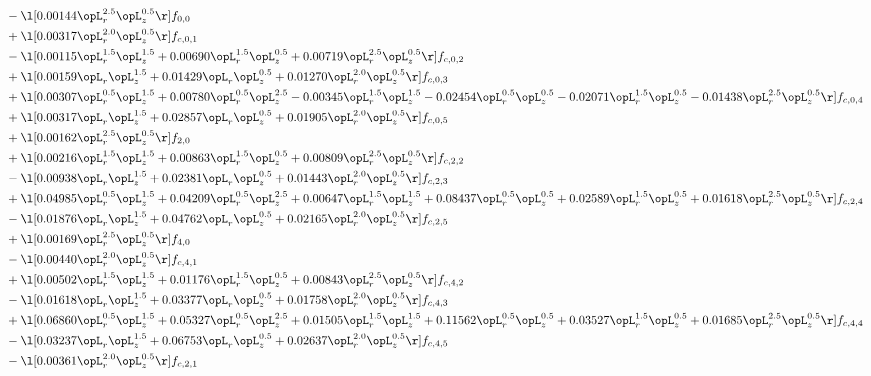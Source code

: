 \begin{alignat}{2}
& - \l[  0.00144 \opL_r^{2.5} \opL_z^{0.5}  \r] f_{0,0} \nonumber \\ 
& + \l[  0.00317 \opL_r^{2.0} \opL_z^{0.5}  \r] f_{c,0,1} \nonumber \\ 
& - \l[  0.00115 \opL_r^{1.5} \opL_z^{1.5} +  0.00690 \opL_r^{1.5} \opL_z^{0.5} +  0.00719 \opL_r^{2.5} \opL_z^{0.5}  \r] f_{c,0,2} \nonumber \\ 
& + \l[  0.00159 \opL_r \opL_z^{1.5} +  0.01429 \opL_r \opL_z^{0.5} +  0.01270 \opL_r^{2.0} \opL_z^{0.5}  \r] f_{c,0,3} \nonumber \\ 
& + \l[  0.00307 \opL_r^{0.5} \opL_z^{1.5} +  0.00780 \opL_r^{0.5} \opL_z^{2.5}   -0.00345 \opL_r^{1.5} \opL_z^{1.5}   -0.02454 \opL_r^{0.5} \opL_z^{0.5}   -0.02071 \opL_r^{1.5} \opL_z^{0.5}   -0.01438 \opL_r^{2.5} \opL_z^{0.5}  \r] f_{c,0,4} \nonumber \\ 
& + \l[  0.00317 \opL_r \opL_z^{1.5} +  0.02857 \opL_r \opL_z^{0.5} +  0.01905 \opL_r^{2.0} \opL_z^{0.5}  \r] f_{c,0,5} \nonumber \\ 
& + \l[  0.00162 \opL_r^{2.5} \opL_z^{0.5}  \r] f_{2,0} \nonumber \\ 
& + \l[  0.00216 \opL_r^{1.5} \opL_z^{1.5} +  0.00863 \opL_r^{1.5} \opL_z^{0.5} +  0.00809 \opL_r^{2.5} \opL_z^{0.5}  \r] f_{c,2,2} \nonumber \\ 
& - \l[  0.00938 \opL_r \opL_z^{1.5} +  0.02381 \opL_r \opL_z^{0.5} +  0.01443 \opL_r^{2.0} \opL_z^{0.5}  \r] f_{c,2,3} \nonumber \\ 
& + \l[  0.04985 \opL_r^{0.5} \opL_z^{1.5} +  0.04209 \opL_r^{0.5} \opL_z^{2.5} +  0.00647 \opL_r^{1.5} \opL_z^{1.5} +  0.08437 \opL_r^{0.5} \opL_z^{0.5} +  0.02589 \opL_r^{1.5} \opL_z^{0.5} +  0.01618 \opL_r^{2.5} \opL_z^{0.5}  \r] f_{c,2,4} \nonumber \\ 
& - \l[  0.01876 \opL_r \opL_z^{1.5} +  0.04762 \opL_r \opL_z^{0.5} +  0.02165 \opL_r^{2.0} \opL_z^{0.5}  \r] f_{c,2,5} \nonumber \\ 
& + \l[  0.00169 \opL_r^{2.5} \opL_z^{0.5}  \r] f_{4,0} \nonumber \\ 
& - \l[  0.00440 \opL_r^{2.0} \opL_z^{0.5}  \r] f_{c,4,1} \nonumber \\ 
& + \l[  0.00502 \opL_r^{1.5} \opL_z^{1.5} +  0.01176 \opL_r^{1.5} \opL_z^{0.5} +  0.00843 \opL_r^{2.5} \opL_z^{0.5}  \r] f_{c,4,2} \nonumber \\ 
& - \l[  0.01618 \opL_r \opL_z^{1.5} +  0.03377 \opL_r \opL_z^{0.5} +  0.01758 \opL_r^{2.0} \opL_z^{0.5}  \r] f_{c,4,3} \nonumber \\ 
& + \l[  0.06860 \opL_r^{0.5} \opL_z^{1.5} +  0.05327 \opL_r^{0.5} \opL_z^{2.5} +  0.01505 \opL_r^{1.5} \opL_z^{1.5} +  0.11562 \opL_r^{0.5} \opL_z^{0.5} +  0.03527 \opL_r^{1.5} \opL_z^{0.5} +  0.01685 \opL_r^{2.5} \opL_z^{0.5}  \r] f_{c,4,4} \nonumber \\ 
& - \l[  0.03237 \opL_r \opL_z^{1.5} +  0.06753 \opL_r \opL_z^{0.5} +  0.02637 \opL_r^{2.0} \opL_z^{0.5}  \r] f_{c,4,5} \nonumber \\ 
& - \l[  0.00361 \opL_r^{2.0} \opL_z^{0.5}  \r] f_{c,2,1} \nonumber \\ 
\end{alignat} 


